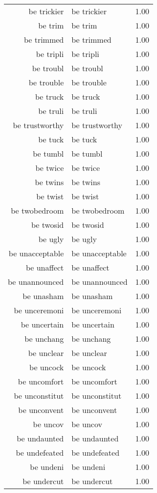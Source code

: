 \begin{table}[ht]
\begin{tabular}{rlr}
  be trickier & be trickier & 1.00 \\ 
  be trim & be trim & 1.00 \\ 
  be trimmed & be trimmed & 1.00 \\ 
  be tripli & be tripli & 1.00 \\ 
  be troubl & be troubl & 1.00 \\ 
  be trouble & be trouble & 1.00 \\ 
  be truck & be truck & 1.00 \\ 
  be truli & be truli & 1.00 \\ 
  be trustworthy & be trustworthy & 1.00 \\ 
  be tuck & be tuck & 1.00 \\ 
  be tumbl & be tumbl & 1.00 \\ 
  be twice & be twice & 1.00 \\ 
  be twins & be twins & 1.00 \\ 
  be twist & be twist & 1.00 \\ 
  be twobedroom & be twobedroom & 1.00 \\ 
  be twosid & be twosid & 1.00 \\ 
  be ugly & be ugly & 1.00 \\ 
  be unacceptable & be unacceptable & 1.00 \\ 
  be unaffect & be unaffect & 1.00 \\ 
  be unannounced & be unannounced & 1.00 \\ 
  be unasham & be unasham & 1.00 \\ 
  be unceremoni & be unceremoni & 1.00 \\ 
  be uncertain & be uncertain & 1.00 \\ 
  be unchang & be unchang & 1.00 \\ 
  be unclear & be unclear & 1.00 \\ 
  be uncock & be uncock & 1.00 \\ 
  be uncomfort & be uncomfort & 1.00 \\ 
  be unconstitut & be unconstitut & 1.00 \\ 
  be unconvent & be unconvent & 1.00 \\ 
  be uncov & be uncov & 1.00 \\ 
  be undaunted & be undaunted & 1.00 \\ 
  be undefeated & be undefeated & 1.00 \\ 
  be undeni & be undeni & 1.00 \\ 
  be undercut & be undercut & 1.00 \\ 

\end{tabular}
\end{table}
